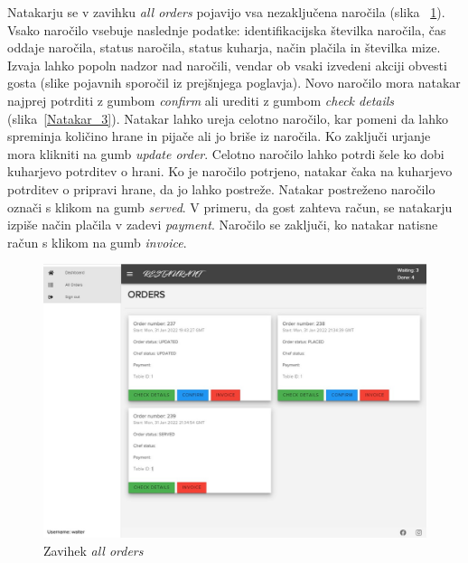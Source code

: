 \documentclass[a4paper, 12pt]{book}
\begin{document}
Natakarju se v zavihku \textit{all orders} pojavijo vsa nezaključena naročila (slika ~\ref{Natakar_2}). Vsako naročilo vsebuje naslednje podatke: identifikacijska številka naročila, čas oddaje naročila, status naročila, status kuharja, način plačila in številka mize. Izvaja lahko popoln nadzor nad naročili, vendar ob vsaki izvedeni akciji obvesti gosta (slike pojavnih sporočil iz prejšnjega poglavja). Novo naročilo mora natakar najprej potrditi z gumbom \textit{confirm} ali urediti z gumbom \textit{check details} (slika~\ref{Natakar_3}). Natakar lahko ureja celotno naročilo, kar pomeni da lahko spreminja količino hrane in pijače ali jo briše iz naročila. Ko zaključi urjanje mora klikniti na gumb \textit{update order}. Celotno naročilo lahko potrdi šele ko dobi kuharjevo potrditev o hrani. Ko je naročilo potrjeno, natakar čaka na kuharjevo potrditev o pripravi hrane, da jo lahko postreže. Natakar postreženo naročilo označi s klikom na gumb \textit{served}. V primeru, da gost zahteva račun, se natakarju izpiše način plačila v zadevi \textit{payment}. Naročilo se zaključi, ko natakar natisne račun s klikom na gumb \textit{invoice}.

\begin{figure}[!htb]
\centering
\includegraphics[width=13.3cm]{waiter_1.jpg}
\caption{Zavihek \textit{all orders}}
\label{Natakar_2}
\end{figure}
\end{document}
